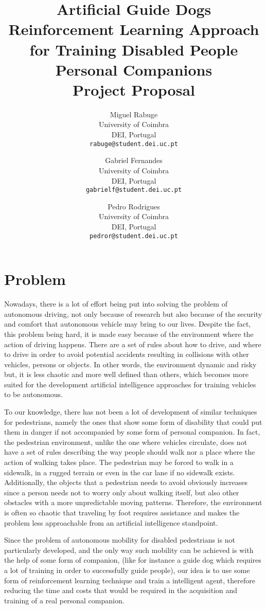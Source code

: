 \documentclass[letterpaper,10pt]{article}
\title{
  \textbf{Artificial Guide Dogs} \\\vspace{2pt}
  \large{Reinforcement Learning Approach for Training Disabled People 
  Personal Companions} \\\vspace{2pt}
  \Large{Project Proposal} 
}
\author{
  Miguel Rabuge\\
  University of Coimbra\\
  DEI, Portugal \\
  \texttt{rabuge@student.dei.uc.pt}
  \and
  Gabriel Fernandes\\
  University of Coimbra\\
  DEI, Portugal\\
  \texttt{gabrielf@student.dei.uc.pt}
  \and
  Pedro Rodrigues\\
  University of Coimbra\\
  DEI, Portugal \\
  \texttt{pedror@student.dei.uc.pt}
}
\begin{document}
\maketitle
\tableofcontents

\section{Problem}

Nowadays, there is a lot of effort being put into solving the problem of 
autonomous driving, not only because of research but also because of the 
security and comfort that autonomous vehicle may bring to our lives. Despite 
the fact, this problem being hard, it is made easy because of the environment
where the action of driving happens. There are a set of rules about how 
to drive, and where to drive in order to avoid potential accidents resulting 
in collisions with other vehicles, persons or objects. In other words, the 
environment dynamic and risky but, it is less chaotic and more well defined 
than others, which becomes more suited for the development artificial 
intelligence approaches for training vehicles to be autonomous.

To our knowledge, there has not been a lot of development of similar
techniques for pedestrians, namely the ones that show some form of 
disability that could put them in danger if not accompanied by some form 
of personal companion. In fact, the pedestrian environment, unlike the
one where vehicles circulate, does not have a set of rules describing the 
way people should walk nor a place where the action of walking takes place.
The pedestrian may be forced to walk in a sidewalk, in a rugged terrain or 
even in the car lane if no sidewalk exists. Additionally, the objects that 
a pedestrian needs to avoid obviously increases since a person needs not to
worry only about walking itself, but also other obstacles with a more
unpredictable moving patterns. Therefore, the environment is often so chaotic 
that traveling by foot requires assistance and makes the problem less 
approachable from an artificial intelligence standpoint.

Since the problem of autonomous mobility for disabled pedestrians is not
particularly developed, and the only way such mobility can be achieved is
with the help of some form of companion, (like for instance a guide dog
which requires a lot of training in order to successfully guide people), 
our idea is to use some form of reinforcement learning technique and train 
a intelligent agent, therefore reducing the time and costs that would be 
required in the acquisition and training of a real personal companion. 
\end{document}
